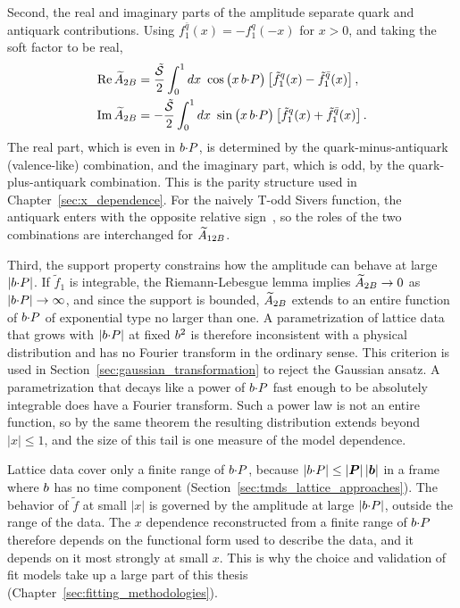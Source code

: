 Second, the real and imaginary parts of the amplitude separate quark and antiquark contributions. Using $f_1^{\bar q}(x) = -f_1^q(-x)$ for $x>0$, and taking the soft factor to be real,
\begin{align}
  \myRe\,\tAmp_{2B} &= \frac{\tilde{\softf}}{2}\int_0^1 dx\ \cos\big(x\,\bvec\tcdot P\big)\left[\tilde f_1^q(x) - \tilde f_1^{\bar q}(x)\right] , \nonumber\\
  \myIm\,\tAmp_{2B} &= -\frac{\tilde{\softf}}{2}\int_0^1 dx\ \sin\big(x\,\bvec\tcdot P\big)\left[\tilde f_1^q(x) + \tilde f_1^{\bar q}(x)\right] .
  \label{eq:re_im_valence}
\end{align}
The real part, which is even in $b{\cdot} P$, is determined by the quark-minus-antiquark (valence-like) combination, and the imaginary part, which is odd, by the quark-plus-antiquark combination. This is the parity structure used in Chapter~\ref{sec:x_dependence}. For the naively T-odd Sivers function, the antiquark enters with the opposite relative sign~\cite{Boussarie:2023izj}, so the roles of the two combinations are interchanged for $\widetilde{A}_{12B}$.

Third, the support property constrains how the amplitude can behave at large $|b{\cdot} P|$. If $\tilde f_1$ is integrable, the Riemann-Lebesgue lemma implies $\widetilde{A}_{2B}\to 0$ as $|b{\cdot} P|\to\infty$, and since the support is bounded, $\widetilde{A}_{2B}$ extends to an entire function of $b{\cdot} P$ of exponential type no larger than one. A parametrization of lattice data that grows with $|b{\cdot} P|$ at fixed $b^2$ is therefore inconsistent with a physical distribution and has no Fourier transform in the ordinary sense. This criterion is used in Section~\ref{sec:gaussian_transformation} to reject the Gaussian ansatz. A parametrization that decays like a power of $b{\cdot} P$ fast enough to be absolutely integrable does have a Fourier transform. Such a power law is not an entire function, so by the same theorem the resulting distribution extends beyond $|x|\le 1$, and the size of this tail is one measure of the model dependence.

Lattice data cover only a finite range of $b{\cdot} P$, because $|b{\cdot} P|\le |\boldsymbol{P}|\,|\boldsymbol{b}|$ in a frame where $b$ has no time component (Section~\ref{sec:tmds_lattice_approaches}). The behavior of $\tilde f$ at small $|x|$ is governed by the amplitude at large $|b{\cdot} P|$, outside the range of the data. The $x$ dependence reconstructed from a finite range of $b{\cdot} P$ therefore depends on the functional form used to describe the data, and it depends on it most strongly at small $x$. This is why the choice and validation of fit models take up a large part of this thesis (Chapter~\ref{sec:fitting_methodologies}).

